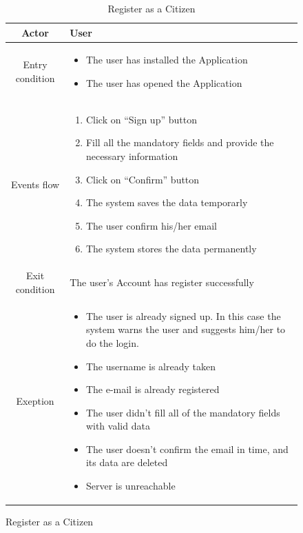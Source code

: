 \documentclass{article}
\begin{document}
		
		
	\begin{figure}[H]
	
		\begin{table} [H]
		\begin{center}
		\caption{Register as a Citizen}
		\begin{tabular}{|c|p{8cm}|}
			\hline
			Actor			&	User\\
			\hline
			Entry condition	&	\begin{itemize}[noitemsep,topsep=0pt]
									\item The user has installed the Application
									\item The user has opened the Application
								\end{itemize}\\
			\hline
			Events flow 		& 	\begin{enumerate}[noitemsep,topsep=0pt]
									\item Click on “Sign up” button
									\item Fill all the mandatory fields and provide the
									 necessary information
									\item Click on “Confirm” button
									\item The system saves the data temporarly
									\item The user confirm his/her email
									\item The system stores the data permanently
								\end{enumerate}\\
			\hline
			Exit condition	& 	The user's Account has register successfully\\
			\hline
			Exeption 		& 	\begin{itemize}[noitemsep,topsep=0pt]
									\item The user is already signed up.
									In this case the system warns the user and suggests
									 him/her to do the login.
									\item The username is already taken
									\item The e-mail is already registered
									\item The user didn’t fill all of the mandatory fields 
									with valid data
									\item The user doesn't confirm the email in time, 
									and its data are deleted
									\item Server is unreachable
								\end{itemize}\\
			\hline
		\end{tabular}	
		\end{center}
		\end{table} 
	

\end{figure}
\end{document}
